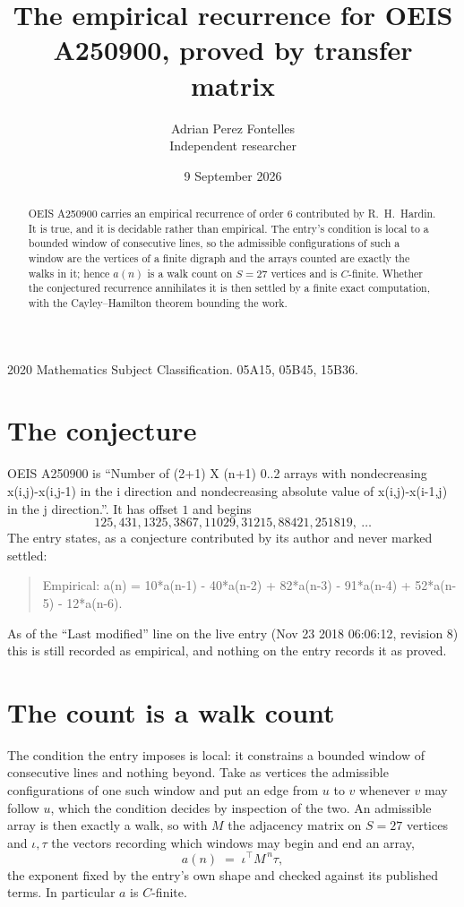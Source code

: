 \documentclass[11pt,a4paper]{article}
\title{The empirical recurrence for OEIS A250900, proved by transfer matrix}
\author{Adrian Perez Fontelles\\ \small Independent researcher}
\date{9 September 2026}
\theoremstyle{plain}
\theoremstyle{definition}
\begin{document}
\maketitle

\begin{abstract}
OEIS A250900 carries an empirical recurrence of order $6$ contributed by R.~H.~Hardin. It is
true, and it is decidable rather than empirical. The entry's condition is local to a bounded window of consecutive lines, so
the admissible configurations of such a window are the vertices of a finite digraph and the
arrays counted are exactly the walks in it; hence $a(n)$ is a walk count on $S=27$ vertices
and is $C$-finite. Whether the conjectured recurrence annihilates it is then settled by a
finite exact computation, with the Cayley--Hamilton theorem bounding the work.
\end{abstract}

\noindent\small 2020 Mathematics Subject Classification. 05A15, 05B45, 15B36.\normalsize

\section{The conjecture}

OEIS A250900 is ``Number of (2+1) X (n+1) 0..2 arrays with nondecreasing x(i,j)-x(i,j-1) in the i direction and nondecreasing absolute value of x(i,j)-x(i-1,j) in the j direction.''. It has offset $1$ and begins
\[
125, 431, 1325, 3867, 11029, 31215, 88421, 251819,\ \dots
\]
The entry states, as a conjecture contributed by its author and never marked settled:
\begin{quote}
Empirical: a(n) = 10*a(n-1) - 40*a(n-2) + 82*a(n-3) - 91*a(n-4) + 52*a(n-5) - 12*a(n-6).
\end{quote}
As of the ``Last modified'' line on the live entry (Nov 23 2018 06:06:12, revision 8) this is still
recorded as empirical, and nothing on the entry records it as proved.

\section{The count is a walk count}

The condition the entry imposes is local: it constrains a bounded window of consecutive lines and nothing beyond. Take as
vertices the admissible configurations of one such window and put an edge from $u$ to $v$
whenever $v$ may follow $u$, which the condition decides by inspection of the two. An
admissible array is then exactly a walk, so with $M$ the adjacency matrix on $S=27$ vertices
and $\iota,\tau$ the vectors recording which windows may begin and end an array,
\[
a(n)\;=\;\iota^{\!\top}M^{\,n}\tau ,
\]
the exponent fixed by the entry's own shape and checked against its published terms. In
particular $a$ is $C$-finite.
\end{document}
